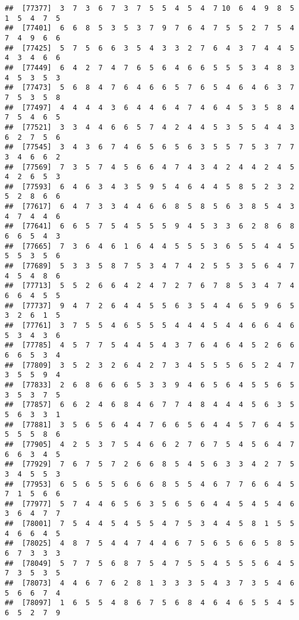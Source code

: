 \documentclass[
]{book}
\begin{document}
\begin{verbatim}
##  [77377]  3  7  3  6  7  3  7  5  5  4  5  4  7 10  6  4  9  8  5  1  5  4  7  5
##  [77401]  6  6  8  5  3  5  3  7  9  7  6  4  7  5  5  2  7  5  4  7  4  9  6  6
##  [77425]  5  7  5  6  6  3  5  4  3  3  2  7  6  4  3  7  4  4  5  4  3  4  6  6
##  [77449]  6  4  2  7  4  7  6  5  6  4  6  6  5  5  5  3  4  8  3  4  5  3  5  3
##  [77473]  5  6  8  4  7  6  4  6  6  5  7  6  5  4  6  4  6  3  7  7  5  3  5  8
##  [77497]  4  4  4  4  3  6  4  4  6  4  7  4  6  4  5  3  5  8  4  7  5  4  6  5
##  [77521]  3  3  4  4  6  6  5  7  4  2  4  4  5  3  5  5  4  4  3  6  2  7  5  6
##  [77545]  3  4  3  6  7  4  6  5  6  5  6  3  5  5  7  5  3  7  7  3  4  6  6  2
##  [77569]  7  3  5  7  4  5  6  6  4  7  4  3  4  2  4  4  2  4  5  4  2  6  5  3
##  [77593]  6  4  6  3  4  3  5  9  5  4  6  4  4  5  8  5  2  3  2  5  2  8  6  6
##  [77617]  6  4  7  3  3  4  4  6  6  8  5  8  5  6  3  8  5  4  3  4  7  4  4  6
##  [77641]  6  6  5  7  5  4  5  5  5  9  4  5  3  3  6  2  8  6  8  6  6  5  4  3
##  [77665]  7  3  6  4  6  1  6  4  4  5  5  5  3  6  5  5  4  4  5  5  5  3  5  6
##  [77689]  5  3  3  5  8  7  5  3  4  7  4  2  5  5  3  5  6  4  7  4  5  4  8  6
##  [77713]  5  5  2  6  6  4  2  4  7  2  7  6  7  8  5  3  4  7  4  6  6  4  5  5
##  [77737]  9  4  7  2  6  4  4  5  5  6  3  5  4  4  6  5  9  6  5  3  2  6  1  5
##  [77761]  3  7  5  5  4  6  5  5  5  4  4  4  5  4  4  6  6  4  6  5  3  4  3  6
##  [77785]  4  5  7  7  5  4  4  5  4  3  7  6  4  6  4  5  2  6  6  6  6  5  3  4
##  [77809]  3  5  2  3  2  6  4  2  7  3  4  5  5  5  6  5  2  4  7  3  5  5  9  4
##  [77833]  2  6  8  6  6  6  5  3  3  9  4  6  5  6  4  5  5  6  5  3  5  3  7  5
##  [77857]  6  6  2  4  6  8  4  6  7  7  4  8  4  4  4  5  6  3  5  5  6  3  3  1
##  [77881]  3  5  6  5  6  4  4  7  6  6  5  6  4  4  5  7  6  4  5  5  5  5  8  6
##  [77905]  4  2  5  3  7  5  4  6  6  2  7  6  7  5  4  5  6  4  7  6  6  3  4  5
##  [77929]  7  6  7  5  7  2  6  6  8  5  4  5  6  3  3  4  2  7  5  3  4  5  5  3
##  [77953]  6  5  6  5  5  6  6  6  8  5  5  4  6  7  7  6  6  4  5  7  1  5  6  6
##  [77977]  5  7  4  4  6  5  6  3  5  6  5  6  4  4  5  4  5  4  6  3  6  4  7  7
##  [78001]  7  5  4  4  5  4  5  5  4  7  5  3  4  4  5  8  1  5  5  4  6  6  4  5
##  [78025]  4  8  7  5  4  4  7  4  4  6  7  5  6  5  6  6  5  8  5  6  7  3  3  3
##  [78049]  5  7  7  5  6  8  7  5  4  7  5  5  4  5  5  5  6  4  5  7  3  5  3  5
##  [78073]  4  4  6  7  6  2  8  1  3  3  3  5  4  3  7  3  5  4  6  5  6  6  7  4
##  [78097]  1  6  5  5  4  8  6  7  5  6  8  4  6  4  6  5  5  4  5  6  5  2  7  9

\end{verbatim}
\end{document}
